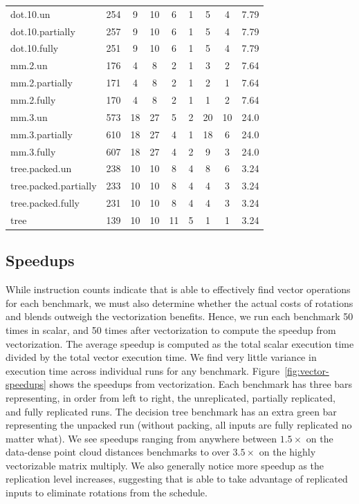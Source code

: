 \begin{table}
\begin{tabular}{lcccccccc}
    dot.10.un & 254 & 9 & 10 & 6 & 1 & 5 & 4 & 7.79\\
    dot.10.partially & 257 & 9 & 10 & 6 & 1 & 5 & 4 & 7.79\\
    dot.10.fully & 251 & 9 & 10 & 6 & 1 & 5 & 4 & 7.79\\

    mm.2.un & 176 & 4 & 8 & 2 & 1 & 3 & 2 & 7.64\\
    mm.2.partially & 171 & 4 & 8 & 2 & 1 & 2 & 1 & 7.64\\
    mm.2.fully & 170 & 4 & 8 & 2 & 1 & 1 & 2 & 7.64\\

    mm.3.un & 573 & 18 & 27 & 5 & 2 & 20 & 10 & 24.0\\
    mm.3.partially & 610 & 18 & 27 & 4 & 1 & 18 & 6 & 24.0\\
    mm.3.fully & 607 & 18 & 27 & 4 & 2 & 9 & 3 & 24.0\\

    tree.packed.un & 238 & 10 & 10 & 8 & 4 & 8 & 6 & 3.24\\
    tree.packed.partially & 233 & 10 & 10 & 8 & 4 & 4 & 3 & 3.24\\
    tree.packed.fully & 231 & 10 & 10 & 8 & 4 & 4 & 3 & 3.24\\
    tree & 139 & 10 & 10 & 11 & 5 & 1 & 1 & 3.24\\\bottomrule
    \end{tabular}
\end{table}

\subsection{Speedups}\label{sec:speedups}
While instruction counts indicate that \system is able to effectively find vector operations for each benchmark, we must also determine whether the actual costs of rotations and blends outweigh the vectorization benefits. Hence, we run each benchmark 50 times in scalar, and 50 times after vectorization to compute the speedup from vectorization.
The average speedup is computed as the total scalar execution time divided by the total vector execution time.
We find very little variance in execution time across individual runs for any benchmark.
Figure~\ref{fig:vector-speedups} shows the speedups from vectorization. Each benchmark has three bars representing, in order from left to right, the unreplicated, partially replicated, and fully replicated runs. 
The decision tree benchmark has an extra green bar representing the unpacked run (without packing, all inputs are fully replicated no matter what).
We see speedups ranging from anywhere between $1.5\times$ on the data-dense point cloud distances benchmarks to over $3.5\times$ on the highly vectorizable matrix multiply.
We also generally notice more speedup as the replication level increases, suggesting that \system is able to take advantage of replicated inputs to eliminate rotations from the schedule.

